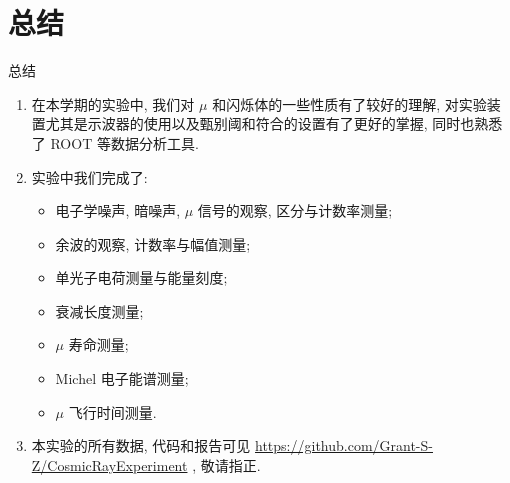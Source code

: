 \documentclass[10pt]{beamer}
\begin{document}
\section{总结}
\label{sec:org208b11d}
\begin{frame}[label={sec:orgb74791b}]{总结}
\begin{enumerate}
\item 在本学期的实验中, 我们对 \(\mu\) 和闪烁体的一些性质有了较好的理解, 对实验装置尤其是示波器的使用以及甄别阈和符合的设置有了更好的掌握, 同时也熟悉了 ROOT 等数据分析工具.
\item 实验中我们完成了:
\begin{itemize}
\item 电子学噪声, 暗噪声, \(\mu\) 信号的观察, 区分与计数率测量;
\item 余波的观察, 计数率与幅值测量;
\item 单光子电荷测量与能量刻度;
\item 衰减长度测量;
\item \(\mu\) 寿命测量;
\item Michel 电子能谱测量;
\item \(\mu\) 飞行时间测量.
\end{itemize}
\item 本实验的所有数据, 代码和报告可见 \url{https://github.com/Grant-S-Z/CosmicRayExperiment} , 敬请指正.
\end{enumerate}
\end{frame}
\end{document}
